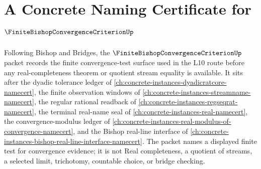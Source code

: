 \chapter{A Concrete Naming Certificate for $\FiniteBishopConvergenceCriterionUp$}
\label{ch:concrete-instances-finite-bishop-convergence-criterion-namecert}

Following Bishop and Bridges, the $\FiniteBishopConvergenceCriterionUp$ packet records the finite convergence-test surface used in the L10 route before any real-completeness theorem or quotient stream equality is available. It sits after the dyadic tolerance ledger of \autoref{ch:concrete-instances-dyadicratcore-namecert}, the finite observation windows of \autoref{ch:concrete-instances-streamname-namecert}, the regular rational readback of \autoref{ch:concrete-instances-regseqrat-namecert}, the terminal real-name seal of \autoref{ch:concrete-instances-real-namecert}, the convergence-modulus ledger of \autoref{ch:concrete-instances-real-modulus-of-convergence-namecert}, and the Bishop real-line interface of \autoref{ch:concrete-instances-bishop-real-line-interface-namecert}. The packet names a displayed finite test for convergence evidence; it is not Real completeness, a quotient of streams, a selected limit, trichotomy, countable choice, or bridge checking.

